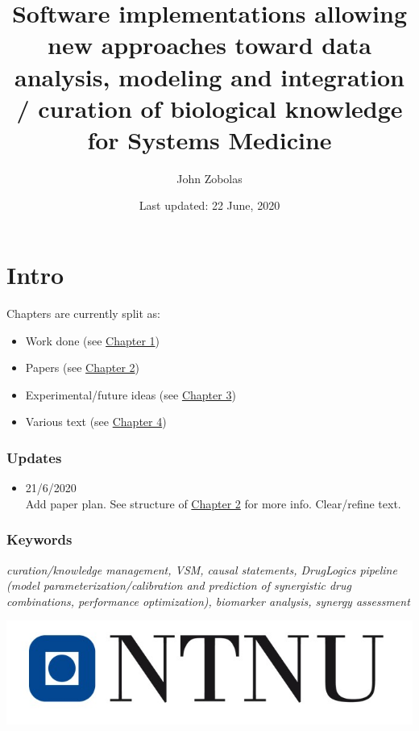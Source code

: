 \documentclass[
  12pt,
]{book}
\title{Software implementations allowing new approaches toward data analysis, modeling and integration / curation of biological knowledge for Systems Medicine}
\author{John Zobolas}
\date{Last updated: 22 June, 2020}
\providecommand{\tightlist}{%
  \setlength{\itemsep}{0pt}\setlength{\parskip}{0pt}}
\begin{document}
\maketitle

{
\hypersetup{linkcolor=}
\setcounter{tocdepth}{1}
\tableofcontents
}
\listoftables
\listoffigures
{}
\hypertarget{intro}{%
\chapter*{Intro}\label{intro}}

Chapters are currently split as:

\begin{itemize}
\tightlist
\item
  Work done (see \protect\hyperlink{phd-work}{Chapter 1})
\item
  Papers (see \protect\hyperlink{phd-papers}{Chapter 2})
\item
  Experimental/future ideas (see \protect\hyperlink{phd-ideas}{Chapter 3})
\item
  Various text (see \protect\hyperlink{text}{Chapter 4})
\end{itemize}

\hypertarget{updates}{%
\subsection*{Updates}\label{updates}}

\begin{itemize}
\tightlist
\item
  21/6/2020\\
  Add paper plan.
  See structure of \protect\hyperlink{phd-papers}{Chapter 2} for more info.
  Clear/refine text.
\end{itemize}

\hypertarget{keywords}{%
\subsection*{Keywords}\label{keywords}}

\emph{curation/knowledge management, VSM, causal statements, DrugLogics pipeline
(model parameterization/calibration and prediction of synergistic drug combinations, performance optimization), biomarker analysis, synergy assessment}

\begin{center}\includegraphics[width=0.5\linewidth]{img/NTNU-logo} \end{center}
\end{document}
